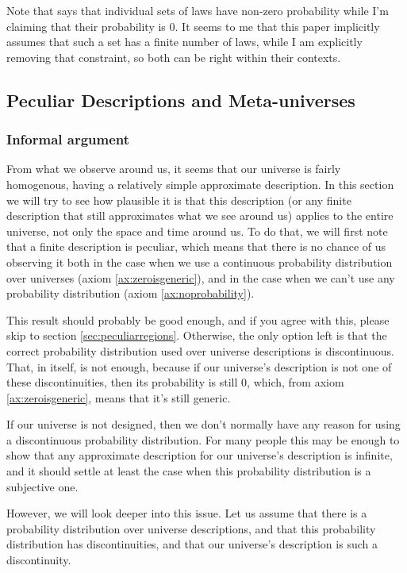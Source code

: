 \documentclass[a4paper
,draft
]{article}
\begin{document}
Note that \textcite{Swinburne2003} says that individual sets of laws
have non-zero probability while I'm claiming that their probability is $0$.
It seems to me that this paper implicitly assumes that
such a set has a finite number of laws, while I am explicitly removing
that constraint, so both can be right within their contexts.

\subsection{Peculiar Descriptions and Meta-universes}
\label{fdaumu}

\subsubsection{Informal argument}

From what we observe around us, it seems that our universe is fairly homogenous,
having a relatively simple approximate description.
In this section we will try to see how plausible it is that this description
(or any finite description that still approximates what we see around us)
applies to the entire universe, not only the space and time around us.
To do that, we will first note that a finite description is peculiar,
which means that there is no chance of
us observing it both in the case when we use a continuous probability
distribution over universes (axiom \ref{ax:zeroisgeneric}),
and in the case when we can't use any probability
distribution (axiom \ref{ax:noprobability}).

This result should probably be good enough, and if you agree with
this, please skip to section \ref{sec:peculiarregions}.
Otherwise, the only option left is that the correct probability
distribution used over universe descriptions is discontinuous.
That, in itself, is not enough, because if our universe's description is not
one of these discontinuities, then its probability is still $0$, which,
from axiom \ref{ax:zeroisgeneric}, means that it's still generic.

If our universe is not designed, then we don't normally have any
reason for using a discontinuous probability distribution.
For many people this may be enough to
show that any approximate description for our universe's description is
infinite, and it should settle at least the case when this probability
distribution is a subjective one.

However, we will look deeper into this issue.
Let us assume that there is a probability distribution over universe
descriptions, and that this probability distribution has discontinuities,
and that our universe's description is such a discontinuity.
\end{document}
